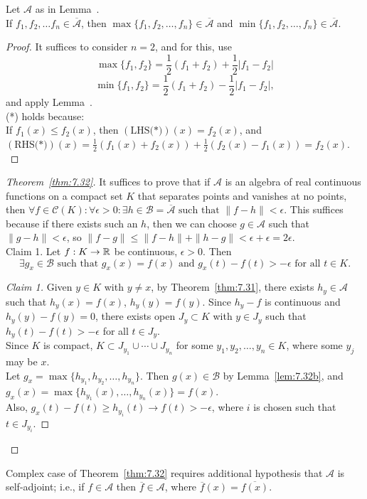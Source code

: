 \begin{lemma}[2]
	\label{lem:7.32b}
	Let $\mathscr{A}$ as in Lemma~.\\
	If $f_{1},f_{2},\ldots f_{n} \in \overline{\mathscr{A}}$, then $\max\{f_{1},f_{2},\ldots ,f_{n}\}  \in \overline{\mathscr{A}}$ and $\min\{f_{1},f_{2},\ldots ,f_{n}\} \in \overline{\mathscr{A}}$.
	\begin{proof}
		It suffices to consider $n=2$, and for this,
		use
		\begin{equation*}
			\max\{f_{1},f_{2}\}=\frac{1}{2}(f_{1}+f_{2})+\frac{1}{2} \left|f_{1}-f_{2}\right|\tag{*}
		\end{equation*}
		\begin{equation*}
			\min\{f_{1},f_{2}\}=\frac{1}{2}(f_{1}+f_{2})-\frac{1}{2} \left|f_{1}-f_{2}\right|
			,\end{equation*}
		and apply Lemma~.\\
		(*) holds because:\\
		If $f_{1}(x)\le f_{2}(x)$, then $(\text{LHS(*)})(x)=f_{2}(x)$, and $(\text{RHS(*)})(x)=\frac{1}{2}(f_{1}(x)+f_{2}(x))+\frac{1}{2}(f_{2}(x)-f_{1}(x))=f_{2}(x)$.\\
	\end{proof}
\end{lemma}
\begin{proof}[Theorem~\ref{thm:7.32}]
	It suffices to prove that if $\mathscr{A}$ is an algebra of real continuous functions on a compact set $K$ that separates points and vanishes at no points, then $\forall{f \in \mathscr{C}(K)}:\forall{\epsilon > 0}: \exists{h \in \mathscr{B}=\overline{\mathscr{A}}} \text{ such that }  \|f-h\|<\epsilon$. This suffices because if there exists such an $h$, then we can choose $g \in \mathscr{A}$ such that $\|g-h\|<\epsilon$, so $\|f-g\|\le \|f-h\|+\|h-g\|<\epsilon+\epsilon=2\epsilon$.\\
	Claim 1. Let $f:K\to \mathbb{R}$ be continuous, $\epsilon>0$. Then \[
		\exists{g_x  \in \mathscr{B}} \text{ such that } g_{x}(x)=f(x) \text{ and } g_{x}(t)-f(t)>-\epsilon \text{ for all } t \in K
		.\]
	\begin{proof}[Claim 1]
		Given $y \in K$ with $y\neq x$,  by Theorem~\ref{thm:7.31}, there exists $h_y \in \mathscr{A}$ such that $h_y(x)=f(x)$, $h_y(y)=f(y)$.
		Since $h_y -f$ is continuous and $h_y(y)-f(y)=0$, there exists open $J_y \subset K$ with $y \in J_y$ such that $h_y(t)-f(t)>-\epsilon$ for all $t \in J_y$.\\
		Since $K$ is compact, $K \subset J_{y_{1}} \cup \cdots \cup J_{y_{n}}$ for some $y_{1},y_{2}, \ldots ,y_{n} \in K$, where some $y_j$ may be $x$.\\
		Let $g_x=\max\{h_{y_{1}},h_{y_{2}}, \ldots , h_{y_n}\}$. Then $g(x) \in \mathscr{B}$ by Lemma~\ref{lem:7.32b}, and $g_x(x)=\max\{h_{y_{1}}(x), \ldots , h_{y_{n}}(x)\}=f(x)$.\\
		Also, $g_x(t)-f(t)\ge h_{y_i}(t)\to f(t)>-\epsilon$, where $i$ is chosen such that $t \in J_{y_i}$.
	\end{proof}
\end{proof}

\begin{thm}[33]
	Complex case of Theorem~\ref{thm:7.32} requires additional hypothesis that $\mathscr{A}$ is self-adjoint; i.e., if $f \in \mathscr{A}$ then $\overline{f}  \in \mathscr{A}$, where $\overline{f}(x) = \overline{f(x)}$.
\end{thm}
